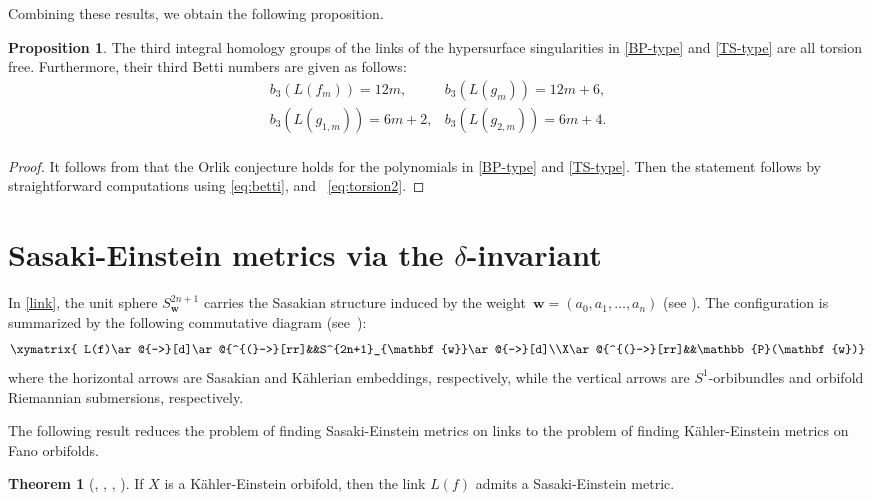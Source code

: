 \documentclass[12pt]{amsart}
\theoremstyle{definition}
\newtheorem{theorem}[equation]{Theorem}
\newtheorem{proposition}[equation]{Proposition}
\theoremstyle{remark}
\begin{document}
Combining these results, we obtain the following proposition.



\begin{proposition}\label{proposition:topology}The third integral homology groups of the links of the hypersurface singularities in \eqref{BP-type} and \eqref{TS-type} are all torsion free. Furthermore, their third Betti numbers are given as follows: 
\[\begin{array}{ll}
b_3(L(f_{m}))=12m,& b_3(L(g_m))=12m+6,\\
b_3(L(g_{1,m}))=6m+2,&
b_3(L(g_{2,m}))=6m+4.\\
\end{array}\]
\end{proposition}
\begin{proof}
It follows from \cite[Theorem~1.3]{HM22} that the Orlik conjecture holds for the polynomials in \eqref{BP-type} and \eqref{TS-type}. Then the statement follows by straightforward computations using \eqref{eq:betti}, 
and ~\eqref{eq:torsion2}.
\end{proof}



\section{Sasaki-Einstein metrics via the $\delta$-invariant}

In \eqref{link}, the unit sphere $S^{2n+1}_{\mathbf{w}}$ carries the Sasakian structure 
induced by the weight~$\mathbf{w} = (a_0, a_1, \dots, a_n)$ (see \cite[\S~1]{BG01} \cite[Example]{Takahashi}).
The configuration is summarized by the following commutative diagram (see~\cite{BN10}):$$
\xymatrix{
L(f)\ar@{->}[d]\ar@{^{(}->}[rr]&&S^{2n+1}_{\mathbf{w}}\ar@{->}[d]\\%
X\ar@{^{(}->}[rr]&&\mathbb{P}(\mathbf{w})}
$$
where the horizontal arrows are Sasakian and Kählerian embeddings, respectively, while the vertical arrows are $S^1$-orbibundles and orbifold Riemannian submersions, respectively.

The following result reduces the problem of finding Sasaki-Einstein metrics on links to the problem of finding K\"ahler-Einstein metrics on Fano orbifolds.
\begin{theorem}[{\cite{BG00}, \cite{BGN03c}, \cite{BGK05}, \cite[Theorem~5]{Kob63}}]\label{theorem:lifting}
If $X$ is a Kähler-Einstein orbifold, then the link $L(f)$ admits a Sasaki-Einstein metric.
\end{theorem}
\end{document}
